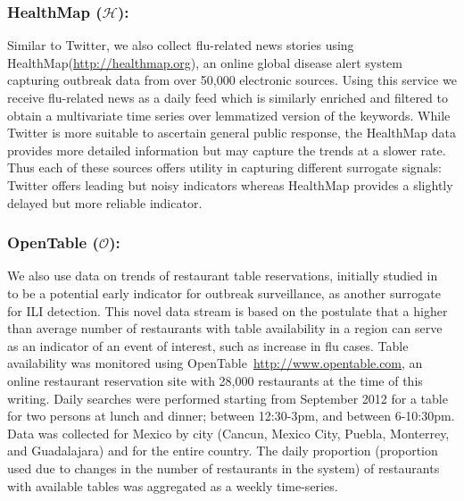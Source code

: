 \subsubsection{HealthMap ($\mathcal{H}$):} 
Similar to Twitter, we also collect flu-related
news stories using HealthMap(\url{http://healthmap.org}), an online global disease alert
system capturing outbreak data from over 50,000 electronic sources.
Using this service we receive flu-related news as a daily feed
which is similarly enriched and filtered to obtain
a multivariate time series over lemmatized version of the keywords. 
While Twitter is more suitable to ascertain general public response, the
HealthMap data provides more detailed information but may capture the trends
at a slower rate. Thus each of these sources offers utility in
capturing different surrogate signals: Twitter offers leading but noisy
indicators whereas HealthMap provides a slightly delayed but more reliable
indicator.

\vspace{-1em}
\subsubsection{OpenTable ($\mathcal{O}$):}
We also use data on trends of restaurant table reservations, initially 
studied in~\cite{elaine2013opentable} to be a potential early indicator for
outbreak surveillance, as another surrogate for ILI detection.
This novel data stream is based on the
postulate that a higher than average number of restaurants with table
availability in a region can serve as an indicator of an event of interest,
such as increase in flu cases. Table availability was monitored using 
OpenTable~\url{http://www.opentable.com}, 
an online restaurant reservation site with 28,000 restaurants at the time
of this writing. Daily searches were performed starting from September 2012 for
a table for two persons at lunch and dinner; between 12:30-3pm, and between
6-10:30pm. Data was collected for Mexico by city (Cancun, Mexico City, Puebla,
Monterrey, and Guadalajara) and for the entire country. The daily proportion
(proportion used due to changes in the number of restaurants in the system) of
restaurants with available tables was aggregated as a weekly time-series.

